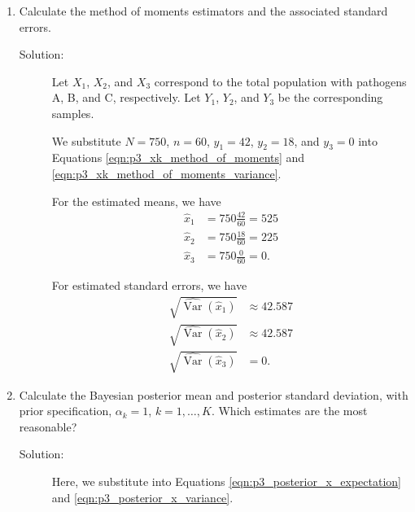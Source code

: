 \documentclass[letterpaper,11pt]{article}
\begin{document}
\begin{enumerate}
\begin{enumerate}
    \begin{enumerate}
    \item Calculate the method of moments estimators and the associated standard
      errors.

      \begin{description}
      \item[Solution:] Let $X_1$, $X_2$, and $X_3$ correspond to the total
        population with pathogens A, B, and C, respectively. Let $Y_1$, $Y_2$,
        and $Y_3$ be the corresponding samples.

        We substitute $N = 750$, $n = 60$, $y_1 = 42$, $y_2 = 18$, and
        $y_3 = 0$ into Equations \ref{eqn:p3_xk_method_of_moments} and
        \ref{eqn:p3_xk_method_of_moments_variance}.

        For the estimated means, we have
        \begin{align}
          \hat{x}_1
          &= 750\frac{42}{60} = 525 \nonumber\\
          \hat{x}_2
          &= 750\frac{18}{60} = 225 \nonumber\\
          \hat{x}_3
          &= 750\frac{0}{60} = 0.
            \label{eqn:p3_method_of_moment_means}
        \end{align}

        For estimated standard errors, we have
        \begin{align}
          \sqrt{\hat{\operatorname{Var}}\left(\hat{x}_1\right)}
          &\approx 42.587 \nonumber\\
          \sqrt{\hat{\operatorname{Var}}\left(\hat{x}_2\right)}
          &\approx 42.587 \nonumber\\
          \sqrt{\hat{\operatorname{Var}}\left(\hat{x}_3\right)}
          &= 0. \label{eqn:p3_method_of_moment_standard_errors}
        \end{align}
                
      \end{description}
    \item Calculate the Bayesian posterior mean and posterior standard
      deviation, with prior specification, $\alpha_k= 1$, $k= 1,\ldots,K$. Which
      estimates are the most reasonable?
      \begin{description}
      \item[Solution:] Here, we substitute into Equations
        \ref{eqn:p3_posterior_x_expectation} and
        \ref{eqn:p3_posterior_x_variance}.


\end{description}
\end{enumerate}
\end{enumerate}
\end{enumerate}
\end{document}
